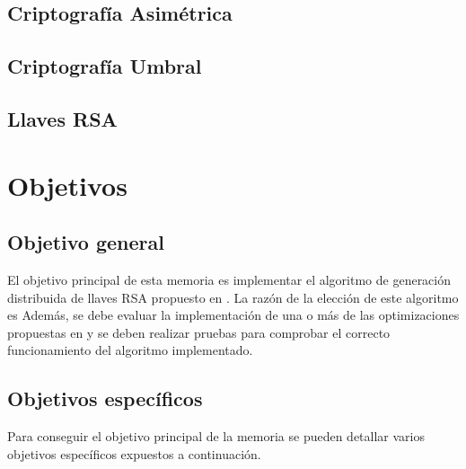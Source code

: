 \documentclass[12pt,letterpaper]{article}
\begin{document}
\subsection{Criptografía Asimétrica}
\subsection{Criptografía Umbral}
\subsection{Llaves RSA}

\section{Objetivos}
\subsection{Objetivo general}
El objetivo principal de esta memoria es implementar el algoritmo de generación distribuida de llaves RSA propuesto en \cite{bonehfranklin01}. La razón de la elección de este algoritmo es  Además, se debe evaluar la implementación de una o más de las optimizaciones propuestas en \cite{bonehfranklin01, fouquestern01} y se deben realizar pruebas para comprobar el correcto funcionamiento del algoritmo implementado.


\subsection{Objetivos específicos}
Para conseguir el objetivo principal de la memoria se pueden detallar varios objetivos específicos expuestos a continuación.
\end{document}
